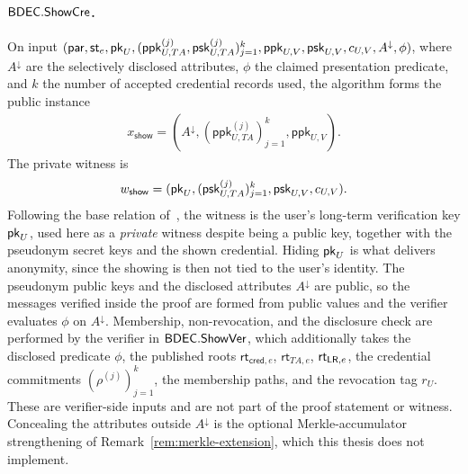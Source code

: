 \begin{construction}
\paragraph{$\mathsf{BDEC}.\mathsf{ShowCre}$.}
On input $(\mathsf{par},\mathsf{st}_e,\mathsf{pk}_U,(\mathsf{ppk}_{U,TA}^{(j)},\mathsf{psk}_{U,TA}^{(j)})_{j=1}^{k},\mathsf{ppk}_{U,V},\mathsf{psk}_{U,V},c_{U,V},A^\downarrow,\phi)$, where $A^\downarrow$ are the selectively disclosed attributes, $\phi$ the claimed presentation predicate, and $k$ the number of accepted credential records used, the algorithm forms the public instance
\begin{equation*}
\begin{aligned}
  x_{\mathsf{show}}
  =
  (A^\downarrow,(\mathsf{ppk}_{U,TA}^{(j)})_{j=1}^{k},\mathsf{ppk}_{U,V}).
\end{aligned}
\end{equation*}
The private witness is
\begin{equation*}
\begin{aligned}
  w_{\mathsf{show}}
  =
  (\mathsf{pk}_U,(\mathsf{psk}_{U,TA}^{(j)})_{j=1}^{k},\mathsf{psk}_{U,V},c_{U,V}).
\end{aligned}
\end{equation*}
Following the base relation of~\cite{10.1007/978-981-96-0957-4_3}, the witness is the user's long-term verification key $\mathsf{pk}_U$, used here as a \emph{private} witness despite being a public key, together with the pseudonym secret keys and the shown credential. Hiding $\mathsf{pk}_U$ is what delivers anonymity, since the showing is then not tied to the user's identity. The pseudonym public keys and the disclosed attributes $A^\downarrow$ are public, so the messages verified inside the proof are formed from public values and the verifier evaluates $\phi$ on $A^\downarrow$. Membership, non-revocation, and the disclosure check are performed by the verifier in $\mathsf{BDEC}.\mathsf{ShowVer}$, which additionally takes the disclosed predicate $\phi$, the published roots $\mathsf{rt}_{\mathsf{cred},e}$, $\mathsf{rt}_{TA,e}$, $\mathsf{rt}_{\mathsf{LR},e}$, the credential commitments $(\rho^{(j)})_{j=1}^{k}$, the membership paths, and the revocation tag $r_U$. These are verifier-side inputs and are not part of the proof statement or witness. Concealing the attributes outside $A^\downarrow$ is the optional Merkle-accumulator strengthening of Remark~\ref{rem:merkle-extension}, which this thesis does not implement.


\end{construction}
